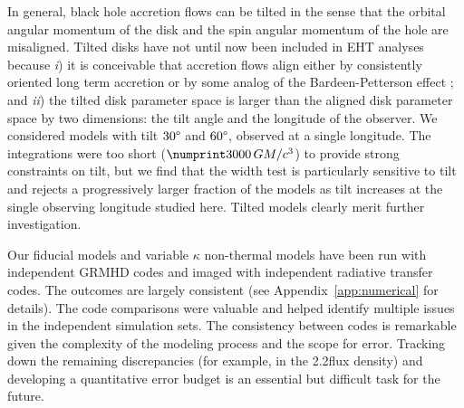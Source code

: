 In general, black hole accretion flows can be tilted in the sense that the orbital angular momentum of the disk and the spin angular momentum of the hole are misaligned.
Tilted disks have not until now been included in EHT analyses because
\emph{i}) it is conceivable that accretion flows align either by consistently oriented long term accretion or by some analog of the Bardeen-Petterson effect \citep{1975ApJ...195L..65B}; and
\emph{ii}) the tilted disk parameter space is larger than the aligned disk parameter space by two dimensions: the tilt angle and the longitude of the observer.
We considered models with tilt $30\degree$ and $60\degree$, observed at a single longitude.
The integrations were too short ($\no{3000}\,\tg$) to provide strong constraints on tilt, but we find that the \mring width test is particularly sensitive to tilt and rejects a progressively larger fraction of the models as tilt increases at the single observing longitude studied here.
Tilted models clearly merit further investigation.

Our fiducial models and variable $\kappa$ non-thermal models have been run with independent GRMHD codes and imaged with independent radiative transfer codes.
The outcomes are largely consistent (see Appendix~\ref{app:numerical} for details).
The code comparisons were valuable and helped identify multiple issues in the independent simulation sets.
The consistency between codes is remarkable given the complexity of the modeling process and the scope for error.
Tracking down the remaining discrepancies (for example, in the 2.2\um flux density) and developing a quantitative error budget is an essential but difficult task for the future.

